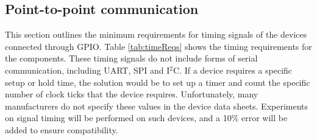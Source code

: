   
  
\subsection{Point-to-point communication}
This section outlines the minimum requirements for timing signals of the devices connected through GPIO. Table \ref{tab:timeReqs} shows the timing requirements for the components. These timing signals do not include forms of serial communication, including UART, SPI and I$^2$C. If a device requires a specific setup or hold time, the solution would be to set up a timer and count the specific number of clock ticks that the device requires. Unfortunately, many manufacturers do not specify these values in the device data sheets. Experiments on signal timing will be performed on such devices, and a 10\% error will be added to ensure compatibility.


